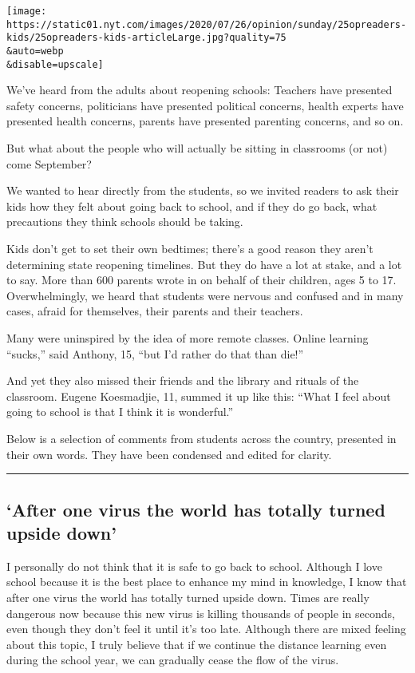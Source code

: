 \texttt{[image: https://static01.nyt.com/images/2020/07/26/opinion/sunday/25opreaders-kids/25opreaders-kids-articleLarge.jpg?quality=75\\\&auto=webp\\\&disable=upscale]}

We've heard from the adults about reopening schools: Teachers have
presented safety concerns, politicians have presented political
concerns, health experts have presented health concerns, parents have
presented parenting concerns, and so on.

But what about the people who will actually be sitting in classrooms (or
not) come September?

We wanted to hear directly from the students, so we invited readers to
ask their kids how they felt about going back to school, and if they do
go back, what precautions they think schools should be taking.

Kids don't get to set their own bedtimes; there's a good reason they
aren't determining state reopening timelines. But they do have a lot at
stake, and a lot to say. More than 600 parents wrote in on behalf of
their children, ages 5 to 17. Overwhelmingly, we heard that students
were nervous and confused and in many cases, afraid for themselves,
their parents and their teachers.

Many were uninspired by the idea of more remote classes. Online learning
``sucks,'' said Anthony, 15, ``but I'd rather do that than die!''

And yet they also missed their friends and the library and rituals of
the classroom. Eugene Koesmadjie, 11, summed it up like this: ``What I
feel about going to school is that I think it is wonderful.''

Below is a selection of comments from students across the country,
presented in their own words. They have been condensed and edited for
clarity.

\begin{center}\rule{0.5\linewidth}{\linethickness}\end{center}

\hypertarget{after-one-virus-the-world-has-totally-turned-upside-down}{%
\subsection{`After one virus the world has totally turned upside
down'}\label{after-one-virus-the-world-has-totally-turned-upside-down}}

I personally do not think that it is safe to go back to school. Although
I love school because it is the best place to enhance my mind in
knowledge, I know that after one virus the world has totally turned
upside down. Times are really dangerous now because this new virus is
killing thousands of people in seconds, even though they don't feel it
until it's too late. Although there are mixed feeling about this topic,
I truly believe that if we continue the distance learning even during
the school year, we can gradually cease the flow of the virus.

